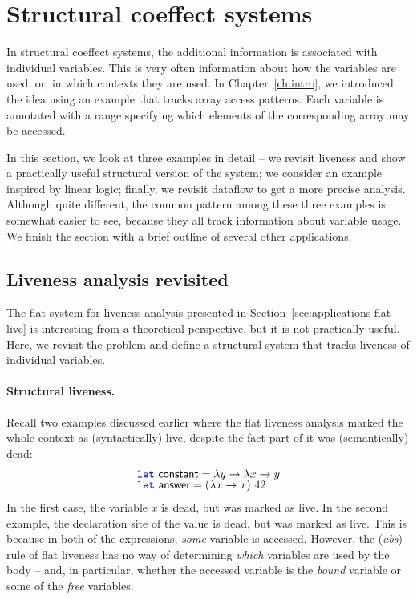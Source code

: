 \section{Structural coeffect systems}
\label{sec:applications-structural}

In structural coeffect systems, the additional information is associated with individual variables.
This is very often information about how the variables are used, or, in which contexts they are used.
In Chapter~\ref{ch:intro}, we introduced the idea using an example that tracks array access patterns.
Each variable is annotated with a range specifying which elements of the corresponding array
may be accessed.

In this section, we look at three examples in detail -- we revisit liveness and show a practically
useful structural version of the system; we consider an example inspired by linear logic; finally,
we revisit dataflow to get a more precise analysis. Although quite different, the common pattern
among these three examples is somewhat easier to see, because they all track information about
variable usage. We finish the section with a brief outline of several other applications.


\subsection{Liveness analysis revisited}
\label{sec:applications-struct-live}

The flat system for liveness analysis presented in Section~\ref{sec:applications-flat-live} is
interesting from a theoretical perspective, but it is not practically useful. Here, we
revisit the problem and define a structural system that tracks liveness of individual variables.

\paragraph{Structural liveness.}
Recall two examples discussed earlier where the flat liveness analysis marked the whole context
as (syntactically) live, despite the fact part of it was (semantically) dead:
%
\begin{equation*}
\begin{array}{l}
\kvd{let}~\ident{constant} = \lambda y \rightarrow \lambda x \rightarrow y\\[-0.25em]
\kvd{let}~\ident{answer} = (\lambda x \rightarrow x)~42
\end{array}
\end{equation*}
%
In the first case, the variable $x$ is dead, but was marked as live. In the second example, the
declaration site of the  value is dead, but was marked as live. This is because in
both of the expressions, \emph{some} variable is accessed. However, the (\emph{abs}) rule of flat
liveness has no way of determining \emph{which} variables are used by the body -- and, in particular,
whether the accessed variable is the \emph{bound} variable or some of the \emph{free} variables.

